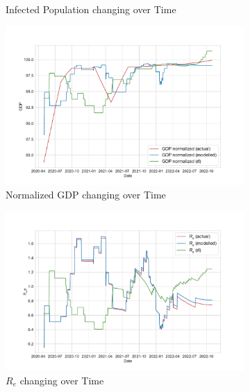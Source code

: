 \documentclass[tikz,fleqn,12pt]{wlscirep}
\begin{document}
\begin{figure}[htbp!]
\begin{subfigure}[t]{0.48\textwidth}
    \caption{Infected Population changing over Time}
  \end{subfigure}
  \label{fig:175975_rl_i}
  \hfill
  \begin{subfigure}[t]{0.48\textwidth}
    \centering
    \includegraphics[width=\linewidth]{images/175975/rl_gdp.pdf}
    \caption{Normalized GDP changing over Time}
  \end{subfigure}
  \label{fig:175975_rl_gdp}
  \hfill
  \begin{subfigure}[t]{0.48\textwidth}
    \centering
    \includegraphics[width=\linewidth]{images/175975/rl_r_eff.pdf}
    \caption{$R_e$ changing over Time}
  \end{subfigure}
  \label{fig:175975_rl_r_eff}
  \hfill
  \begin{subfigure}[t]{0.48\textwidth}
    \centering

\end{subfigure}
\end{figure}
\end{document}
